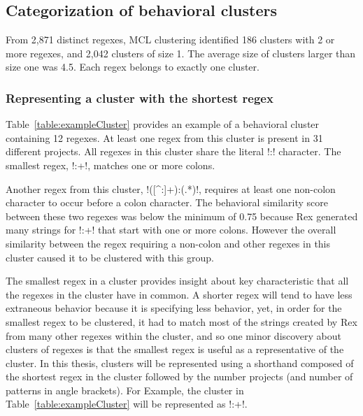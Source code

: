 \subsection{Categorization of behavioral clusters}
From 2,871 distinct regexes, MCL clustering identified 186 clusters with 2 or more regexes, and 2,042 clusters of size 1.
The average size of clusters larger than size one was 4.5.  Each regex belongs to exactly one cluster.



\subsubsection{Representing a cluster with the shortest regex}
Table~\ref{table:exampleCluster} provides an example of a behavioral cluster containing 12 regexes. At least one regex from this cluster is present in 31 different projects.  All regexes in this cluster share the literal \cverb!:! character. The smallest regex, \cverb!:+!,  matches one or more colons.

Another regex from this cluster, \cverb!([^:]+):(.*)!, requires at least one non-colon character to occur before a colon character.  The behavioral similarity score between these two regexes was below the minimum of 0.75 because Rex generated many strings for \cverb!:+! that start with one or more colons.  However the overall similarity between the regex requiring a non-colon and other regexes in this cluster caused it to be clustered with this group.

The smallest regex in a cluster provides insight about key characteristic that all the regexes in the cluster have in common.  A shorter regex will tend to have less extraneous behavior because it is specifying less behavior, yet, in order for the smallest regex to be clustered, it had to match most of the strings created by Rex from many other regexes within the cluster, and so one minor discovery about clusters of regexes is that {the smallest regex is useful as a representative of the cluster}.  In this thesis, clusters will be represented using a shorthand composed of the shortest regex in the cluster followed by the number projects (and number of patterns in angle brackets).  For Example, the cluster in Table~\ref{table:exampleCluster} will be represented as \cverb!:+!.

